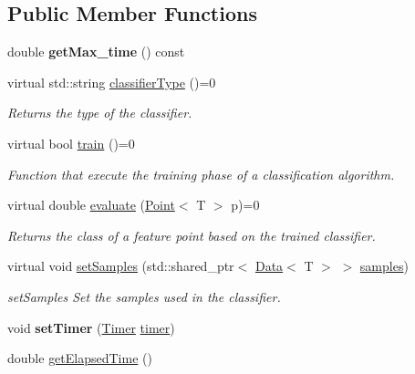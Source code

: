 \subsection*{Public Member Functions}
\begin{DoxyCompactItemize}
\item 
\mbox{\label{class_classifier_ae59109832c17394f457baa92b910a55d}} 
double {\bfseries get\+Max\+\_\+time} () const
\item 
virtual std\+::string \hyperlink{class_classifier_ab40f42f957ec50939bd9a6b0cd5d1786}{classifier\+Type} ()=0
\begin{DoxyCompactList}\small\item\em Returns the type of the classifier. \end{DoxyCompactList}\item 
virtual bool \hyperlink{class_classifier_a120849bfdfa3ba7a0388b32b2d76bf4f}{train} ()=0
\begin{DoxyCompactList}\small\item\em Function that execute the training phase of a classification algorithm. \end{DoxyCompactList}\item 
virtual double \hyperlink{class_classifier_ab3b9544a8d9c3cbde8d5865c7e9be0fb}{evaluate} (\hyperlink{class_point}{Point}$<$ T $>$ p)=0
\begin{DoxyCompactList}\small\item\em Returns the class of a feature point based on the trained classifier. \end{DoxyCompactList}\item 
virtual void \hyperlink{class_classifier_ad32dac7fcf649c5642c39f2ea22f3fde}{set\+Samples} (std\+::shared\+\_\+ptr$<$ \hyperlink{class_data}{Data}$<$ T $>$ $>$ \hyperlink{class_classifier_a0000b47a2e0784ada4c52d7046c4adb8}{samples})
\begin{DoxyCompactList}\small\item\em set\+Samples Set the samples used in the classifier. \end{DoxyCompactList}\item 
\mbox{\label{class_classifier_ad86224f59e1c7722fa34f63707bf0221}} 
void {\bfseries set\+Timer} (\hyperlink{class_timer}{Timer} \hyperlink{class_classifier_a7426be6798e9a184e6d968f91a361a93}{timer})
\item 
double \hyperlink{class_classifier_abbed7a8ea8050ae19a2c4c5f4a5e6002}{get\+Elapsed\+Time} ()

\end{DoxyCompactItemize}
